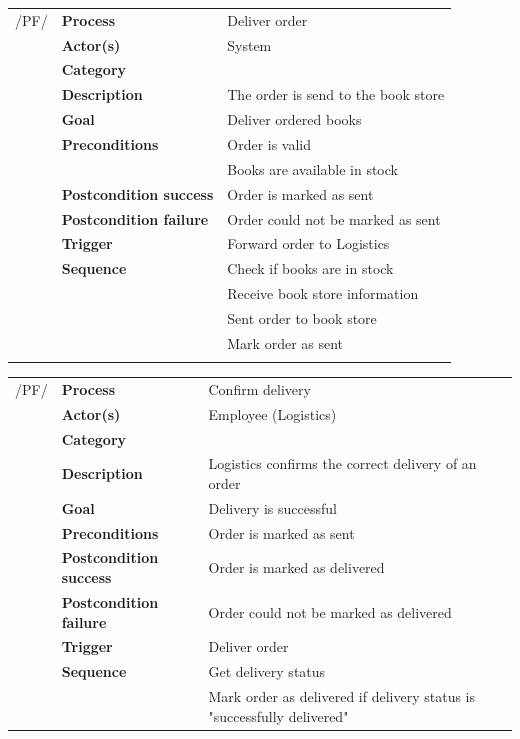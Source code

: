 \documentclass[11pt,a4paper,oneside,svgnames]{report}
\begin{document}
\noindent
\begin{tabular}{p{1.5cm}p{3cm}p{8cm}}
/PF/	& \textbf{Process} & Deliver order\\
		& \textbf{Actor(s)} & System\\
		& \textbf{Category} & \\
		& \textbf{Description}	 &  The order is send to the book store\\
		& \textbf{Goal} & Deliver ordered books\\
		& \textbf{Preconditions} & Order is valid\\
		& & Books are available in stock\\
		& \textbf{Postcondition success} & Order is marked as sent\\
		& \textbf{Postcondition failure} & Order could not be marked as sent\\
		& \textbf{Trigger} & Forward order to Logistics\\
		& \textbf{Sequence} & Check if books are in stock\\
		& & Receive book store information\\
		& & Sent order to book store\\
		& & Mark order as sent\\
		
\hfill \\
\end{tabular}

\noindent
\begin{tabular}{p{1.5cm}p{3cm}p{8cm}}
/PF/	& \textbf{Process} & Confirm delivery\\
		& \textbf{Actor(s)} & Employee (Logistics)\\
		& \textbf{Category} & \\
		& \textbf{Description}	 & Logistics confirms the correct delivery of an order\\
		& \textbf{Goal} & Delivery is successful\\
		& \textbf{Preconditions} & Order is marked as sent\\
		& \textbf{Postcondition success} & Order is marked as delivered\\
		& \textbf{Postcondition failure} & Order could not be marked as delivered\\
		& \textbf{Trigger} & Deliver order\\
		& \textbf{Sequence} & Get delivery status\\
		& & Mark order as delivered if delivery status is "successfully delivered"
		
\hfill \\
\end{tabular}
\end{document}
